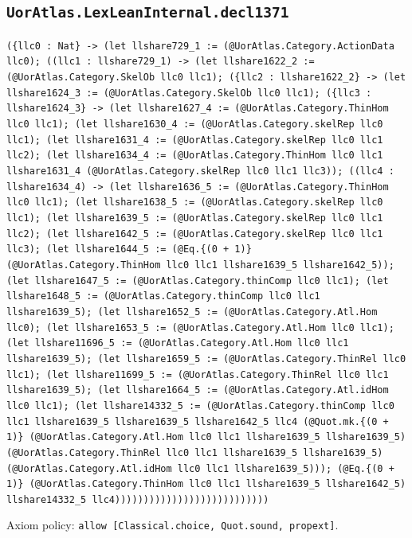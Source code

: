 \documentclass[11pt]{article}
\begin{document}
\subsection*{\texttt{UorAtlas.LexLeanInternal.decl1371}}
\noindent\texttt{(\{llc0 : Nat\} -> (let llshare729\_1 := (@UorAtlas.Category.ActionData llc0); ((llc1 : llshare729\_1) -> (let llshare1622\_2 := (@UorAtlas.Category.SkelOb llc0 llc1); (\{llc2 : llshare1622\_2\} -> (let llshare1624\_3 := (@UorAtlas.Category.SkelOb llc0 llc1); (\{llc3 : llshare1624\_3\} -> (let llshare1627\_4 := (@UorAtlas.Category.ThinHom llc0 llc1); (let llshare1630\_4 := (@UorAtlas.Category.skelRep llc0 llc1); (let llshare1631\_4 := (@UorAtlas.Category.skelRep llc0 llc1 llc2); (let llshare1634\_4 := (@UorAtlas.Category.ThinHom llc0 llc1 llshare1631\_4 (@UorAtlas.Category.skelRep llc0 llc1 llc3)); ((llc4 : llshare1634\_4) -> (let llshare1636\_5 := (@UorAtlas.Category.ThinHom llc0 llc1); (let llshare1638\_5 := (@UorAtlas.Category.skelRep llc0 llc1); (let llshare1639\_5 := (@UorAtlas.Category.skelRep llc0 llc1 llc2); (let llshare1642\_5 := (@UorAtlas.Category.skelRep llc0 llc1 llc3); (let llshare1644\_5 := (@Eq.\{(0 + 1)\} (@UorAtlas.Category.ThinHom llc0 llc1 llshare1639\_5 llshare1642\_5)); (let llshare1647\_5 := (@UorAtlas.Category.thinComp llc0 llc1); (let llshare1648\_5 := (@UorAtlas.Category.thinComp llc0 llc1 llshare1639\_5); (let llshare1652\_5 := (@UorAtlas.Category.Atl.Hom llc0); (let llshare1653\_5 := (@UorAtlas.Category.Atl.Hom llc0 llc1); (let llshare11696\_5 := (@UorAtlas.Category.Atl.Hom llc0 llc1 llshare1639\_5); (let llshare1659\_5 := (@UorAtlas.Category.ThinRel llc0 llc1); (let llshare11699\_5 := (@UorAtlas.Category.ThinRel llc0 llc1 llshare1639\_5); (let llshare1664\_5 := (@UorAtlas.Category.Atl.idHom llc0 llc1); (let llshare14332\_5 := (@UorAtlas.Category.thinComp llc0 llc1 llshare1639\_5 llshare1639\_5 llshare1642\_5 llc4 (@Quot.mk.\{(0 + 1)\} (@UorAtlas.Category.Atl.Hom llc0 llc1 llshare1639\_5 llshare1639\_5) (@UorAtlas.Category.ThinRel llc0 llc1 llshare1639\_5 llshare1639\_5) (@UorAtlas.Category.Atl.idHom llc0 llc1 llshare1639\_5))); (@Eq.\{(0 + 1)\} (@UorAtlas.Category.ThinHom llc0 llc1 llshare1639\_5 llshare1642\_5) llshare14332\_5 llc4)))))))))))))))))))))))))))}\par
\noindent Axiom policy: \texttt{allow [Classical.choice, Quot.sound, propext]}.\par
\end{document}
